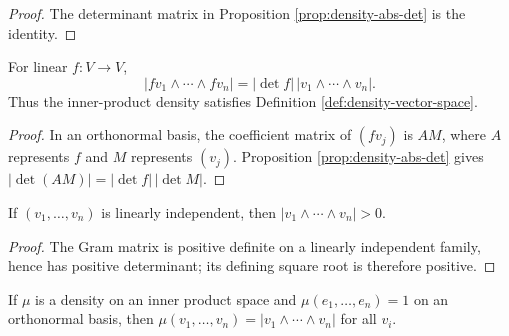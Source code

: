 \begin{proof}

\sketch The determinant matrix in Proposition \ref{prop:density-abs-det} is the identity.
\end{proof}

\begin{proposition}
\label{prop:density-transformation-law}





For linear $f:V\to V$,
\[
|fv_1\wedge\cdots\wedge fv_n|=|\det f|\,|v_1\wedge\cdots\wedge v_n|.
\]
Thus the inner-product density satisfies Definition \ref{def:density-vector-space}.
\end{proposition}

\begin{proof}

\sketch In an orthonormal basis, the coefficient matrix of $(fv_j)$ is $AM$, where $A$ represents $f$ and $M$ represents $(v_j)$. Proposition \ref{prop:density-abs-det} gives $|\det(AM)|=|\det f|\,|\det M|$.
\end{proof}

\begin{proposition}
\label{prop:density-positive}





If $(v_1,\ldots,v_n)$ is linearly independent, then $|v_1\wedge\cdots\wedge v_n|>0$.
\end{proposition}

\begin{proof}

\sketch The Gram matrix is positive definite on a linearly independent family, hence has positive determinant; its defining square root is therefore positive.
\end{proof}

\begin{proposition}
\label{prop:density-uniqueness-pointwise}





If $\mu$ is a density on an inner product space and $\mu(e_1,\ldots,e_n)=1$ on an orthonormal basis, then $\mu(v_1,\ldots,v_n)=|v_1\wedge\cdots\wedge v_n|$ for all $v_i$.
\end{proposition}

